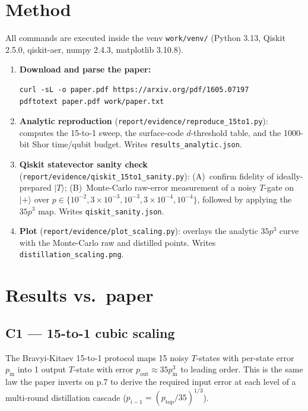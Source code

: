 \documentclass[11pt]{article}
\begin{document}
\section{Method}
\label{sec:method}

All commands are executed inside the venv
\verb|work/venv/| (Python 3.13, Qiskit 2.5.0, qiskit-aer, numpy 2.4.3,
matplotlib 3.10.8).

\begin{enumerate}
  \item \textbf{Download and parse the paper:}
  \begin{lstlisting}
curl -sL -o paper.pdf https://arxiv.org/pdf/1605.07197
pdftotext paper.pdf work/paper.txt
  \end{lstlisting}
  \item \textbf{Analytic reproduction} (\texttt{report/evidence/reproduce\_15to1.py}):
  computes the 15-to-1 sweep, the surface-code $d$-threshold table,
  and the 1000-bit Shor time/qubit budget. Writes
  \texttt{results\_analytic.json}.
  \item \textbf{Qiskit statevector sanity check}
  (\texttt{report/evidence/qiskit\_15to1\_sanity.py}): (A)~confirm
  fidelity of ideally-prepared $|T\rangle$; (B)~Monte-Carlo raw-error
  measurement of a noisy $T$-gate on $|+\rangle$ over $p\in\{10^{-2},
  3\times 10^{-3}, 10^{-3}, 3\times 10^{-4}, 10^{-4}\}$, followed by
  applying the $35 p^{3}$ map. Writes \texttt{qiskit\_sanity.json}.
  \item \textbf{Plot} (\texttt{report/evidence/plot\_scaling.py}):
  overlays the analytic $35 p^{3}$ curve with the Monte-Carlo raw and
  distilled points. Writes \texttt{distillation\_scaling.png}.
\end{enumerate}

\section{Results vs.\ paper}

\subsection{C1 --- 15-to-1 cubic scaling}
\label{sec:c1}

The Bravyi-Kitaev 15-to-1 protocol maps 15 noisy $T$-states with
per-state error $p_{\text{in}}$ into 1 output $T$-state with error
$p_{\text{out}} \approx 35 p_{\text{in}}^{3}$ to leading order. This
is the same law the paper inverts on p.7 to derive the required
input error at each level of a multi-round distillation cascade
($p_{i-1}=(p_{\text{top}}/35)^{1/3}$).
\end{document}
